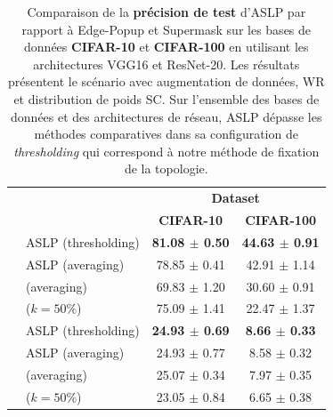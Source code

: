 \begin{table}[htbp]
  \centering\begin{tabular}{llcc}
    \cmidrule[\heavyrulewidth]{3-4}
                                                          &                                                  & \multicolumn{2}{c}{\textbf{Dataset}}                             \\
                                                          &                                                  & \textbf{CIFAR-10}                    & \textbf{CIFAR-100}        \\
    \toprule
    \multirow{6}{*}{} \multirow{4}{*}{\textbf{ResNet-20}} & \ac{ASLP} (thresholding)                              & \textbf{ 81.08 $\pm$ 0.50}           & \textbf{44.63 $\pm$ 0.91} \\
                                                          & \ac{ASLP} (averaging)                                 & 78.85 $\pm$ 0.41                     & 42.91 $\pm$ 1.14          \\
                                                          & \cite{DBLP:conf/nips/ZhouLLY19} (averaging)      & 69.83 $\pm$ 1.20                     & 30.60 $\pm$ 0.91          \\
                                                          & \cite{DBLP:conf/cvpr/RamanujanWKFR20} ($k=50\%$) & 75.09 $\pm$ 1.41                     & 22.47 $\pm$ 1.37          \\
    \midrule
    \multirow{4}{*}{\textbf{VGG16}}                       & \ac{ASLP} (thresholding)                              & \textbf{24.93 $\pm$ 0.69}            & \textbf{8.66 $\pm$ 0.33}  \\
                                                          & \ac{ASLP} (averaging)                                 & 24.93 $\pm$ 0.77                     & 8.58 $\pm$ 0.32           \\
                                                          & \cite{DBLP:conf/nips/ZhouLLY19} (averaging)      & 25.07 $\pm$ 0.34                     & 7.97 $\pm$ 0.35           \\
                                                          & \cite{DBLP:conf/cvpr/RamanujanWKFR20} ($k=50\%$) & 23.05 $\pm$ 0.84                     & 6.65 $\pm$ 0.38           \\
    \bottomrule
  \end{tabular}
  \caption{Comparaison de la \textbf{précision de test} d'\ac{ASLP} par rapport
  à Edge-Popup et Supermask
  \cite{DBLP:conf/cvpr/RamanujanWKFR20,DBLP:conf/nips/ZhouLLY19} sur les bases
  de données \textbf{CIFAR-10} et \textbf{CIFAR-100} en utilisant les
  architectures VGG16 et ResNet-20. Les résultats présentent le scénario avec
  augmentation de données, \acf{WR} et distribution de poids \acf{SC}. Sur
  l'ensemble des bases de données et des architectures de réseau, \ac{ASLP}
  dépasse les méthodes comparatives dans sa configuration de
  \textit{thresholding} qui correspond à notre méthode de fixation de la
  topologie. }
  \label{tab:res2:r20_VGG16_performances_comparison}
\end{table}


